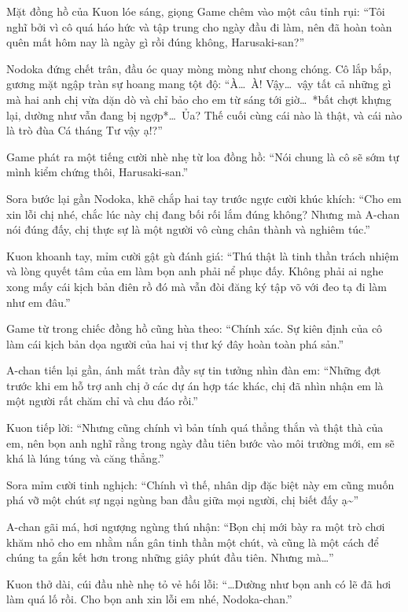 \documentclass[../main.tex]{subfiles}
\begin{document}
Mặt đồng hồ của Kuon lóe sáng, giọng Game chêm vào một câu tỉnh rụi: ``Tôi nghĩ bởi vì cô quá háo hức và tập trung cho ngày đầu đi làm, nên đã hoàn toàn quên mất hôm nay là ngày gì rồi đúng không, Harusaki-san?''

Nodoka đứng chết trân, đầu óc quay mòng mòng như chong chóng. Cô lắp bắp, gương mặt ngập tràn sự hoang mang tột độ: ``À\dots\ À! Vậy\dots\ vậy tất cả những gì mà hai anh chị vừa dặn dò và chỉ bảo cho em từ sáng tới giờ\dots\ *bất chợt khựng lại, dường như vẫn đang bị ngợp*\dots\ Ủa? Thế cuối cùng cái nào là thật, và cái nào là trò đùa Cá tháng Tư vậy ạ!?''

Game phát ra một tiếng cười nhè nhẹ từ loa đồng hồ: ``Nói chung là cô sẽ sớm tự mình kiểm chứng thôi, Harusaki-san.''

Sora bước lại gần Nodoka, khẽ chắp hai tay trước ngực cười khúc khích: ``Cho em xin lỗi chị nhé, chắc lúc này chị đang bối rối lắm đúng không? Nhưng mà A-chan nói đúng đấy, chị thực sự là một người vô cùng chân thành và nghiêm túc.''

Kuon khoanh tay, mỉm cười gật gù đánh giá: ``Thú thật là tinh thần trách nhiệm và lòng quyết tâm của em làm bọn anh phải nể phục đấy. Không phải ai nghe xong mấy cái kịch bản điên rồ đó mà vẫn đòi đăng ký tập võ với đeo tạ đi làm như em đâu.''

Game từ trong chiếc đồng hồ cũng hùa theo: ``Chính xác. Sự kiên định của cô làm cái kịch bản dọa người của hai vị thư ký đây hoàn toàn phá sản.''

A-chan tiến lại gần, ánh mắt tràn đầy sự tin tưởng nhìn đàn em: ``Những đợt trước khi em hỗ trợ anh chị ở các dự án hợp tác khác, chị đã nhìn nhận em là một người rất chăm chỉ và chu đáo rồi.''

Kuon tiếp lời: ``Nhưng cũng chính vì bản tính quá thẳng thắn và thật thà của em, nên bọn anh nghĩ rằng trong ngày đầu tiên bước vào môi trường mới, em sẽ khá là lúng túng và căng thẳng.''

Sora mỉm cười tinh nghịch: ``Chính vì thế, nhân dịp đặc biệt này em cũng muốn phá vỡ một chút sự ngại ngùng ban đầu giữa mọi người, chị biết đấy ạ\~{}''

A-chan gãi má, hơi ngượng ngùng thú nhận: ``Bọn chị mới bày ra một trò chơi khăm nhỏ cho em nhằm nắn gân tinh thần một chút, và cũng là một cách để chúng ta gắn kết hơn trong những giây phút đầu tiên. Nhưng mà\dots''

Kuon thở dài, cúi đầu nhè nhẹ tỏ vẻ hối lỗi: ``\dots Dường như bọn anh có lẽ đã hơi làm quá lố rồi. Cho bọn anh xin lỗi em nhé, Nodoka-chan.''
\end{document}
